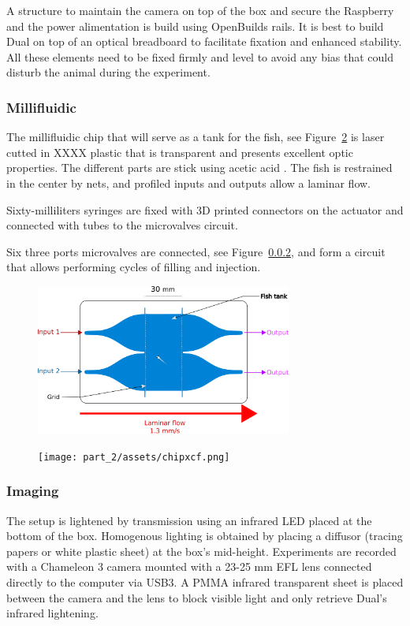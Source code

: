   A structure to maintain the camera on top of the box and secure the Raspberry and the power alimentation is build using OpenBuilds rails. It is best to build Dual on top of an optical breadboard to facilitate fixation and enhanced stability. All these elements need to be fixed firmly and level to avoid any bias that could disturb the animal during the experiment.

  \subsubsection{Millifluidic}
  The millifluidic chip that will serve as a tank for the fish, see Figure~\ref{dual_chip_visu} is laser cutted in XXXX plastic that is transparent and presents excellent optic properties. The different parts are stick using acetic acid \cite{}. The fish is restrained in the center by nets, and profiled inputs and outputs allow a laminar flow.

  Sixty-milliliters syringes are fixed with 3D printed connectors on the actuator and connected with tubes to the microvalves circuit.

  Six three ports microvalves are connected, see Figure~\ref{}, and form a circuit that allows performing cycles of filling and injection.

    \begin{figure}[h]
      \centering
      \includegraphics[width=0.75\textwidth]{part_2/assets/chip.png}
      \caption{\textbf{}}
      \label{dual_chip}
    \end{figure}

    \begin{figure}[h]
      \centering
      \texttt{[image: part\_2/assets/chipxcf.png]}
      \caption{\textbf{}}
      \label{dual_chip_visu}
    \end{figure}

  \subsubsection{Imaging}
  The setup is lightened by transmission using an infrared LED placed at the bottom of the box. Homogenous lighting is obtained by placing a diffusor (tracing papers or white plastic sheet) at the box's mid-height. Experiments are recorded with a Chameleon 3 camera mounted with a 23-25 mm EFL lens connected directly to the computer via USB3. A PMMA infrared transparent sheet is placed between the camera and the lens to block visible light and only retrieve Dual's infrared lightening.

